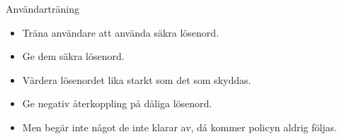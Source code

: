 \documentclass{beamer}
\begin{document}

\begin{frame}{\insertsubsectionhead}{Användarträning}
  \begin{itemize}
    \item Träna användare att använda säkra lösenord.
    \item Ge dem säkra lösenord.
    \item Värdera lösenordet lika starkt som det som skyddas.
    \item Ge negativ återkoppling på dåliga lösenord.
    \item Men begär inte något de inte klarar av, då kommer policyn aldrig 
      följas.
  \end{itemize}
\end{frame}
\end{document}
